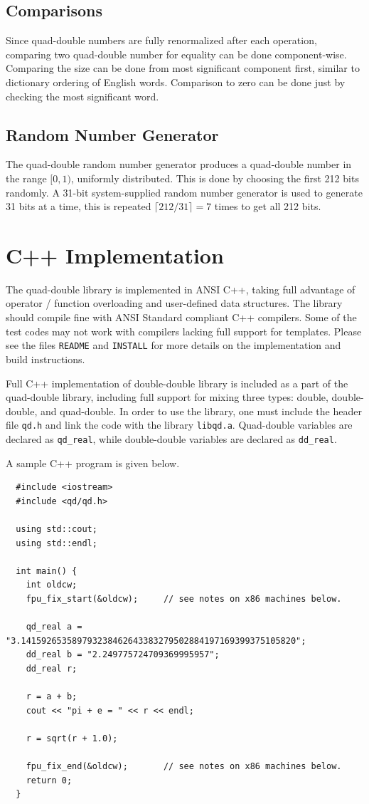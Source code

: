 \documentclass[11pt]{article}
\theoremstyle{definition}
\begin{document}
\subsection{Comparisons}
Since quad-double numbers are fully renormalized after each 
operation, comparing two quad-double number for equality can
be done component-wise.  Comparing the size can be done from
most significant component first, similar to dictionary ordering
of English words.  Comparison to zero can be done just by checking
the most significant word.

\subsection{Random Number Generator}
The quad-double random number generator produces a quad-double
number in the range $[0, 1)$, uniformly distributed.  This is 
done by choosing the first 212 bits randomly.  A 31-bit system-supplied
random number generator is used to generate 31 bits at a time, 
this is repeated $\lceil 212 / 31 \rceil = 7$ times to get
all 212 bits.

\section{C++ Implementation} \label{sec:implement}
  The quad-double library is implemented in ANSI C++, taking full
advantage of operator / function overloading and user-defined data 
structures.  The library should compile fine with ANSI Standard compliant
C++ compilers.  Some of the test codes may not work with compilers
lacking full support for templates.  Please see the files {\tt README}
and {\tt INSTALL} for more details on the implementation and build 
instructions.

  Full C++ implementation of double-double library is included as
a part of the quad-double library, including full support for mixing
three types: double, double-double, and quad-double.  In order to use
the library, one must include the header file {\tt qd.h} 
and link the code with the library {\tt libqd.a}.  
Quad-double variables are declared as {\tt qd\_real}, while double-double
variables are declared as {\tt dd\_real}.

A sample C++ program is given below.

\begin{tt}\begin{verbatim}
  #include <iostream>
  #include <qd/qd.h>

  using std::cout;
  using std::endl;

  int main() {
    int oldcw;
    fpu_fix_start(&oldcw);     // see notes on x86 machines below.

    qd_real a = "3.141592653589793238462643383279502884197169399375105820";
    dd_real b = "2.249775724709369995957";
    dd_real r;
    
    r = a + b;
    cout << "pi + e = " << r << endl;

    r = sqrt(r + 1.0);

    fpu_fix_end(&oldcw);       // see notes on x86 machines below.
    return 0;
  }
\end{verbatim}\end{tt}
\end{document}
